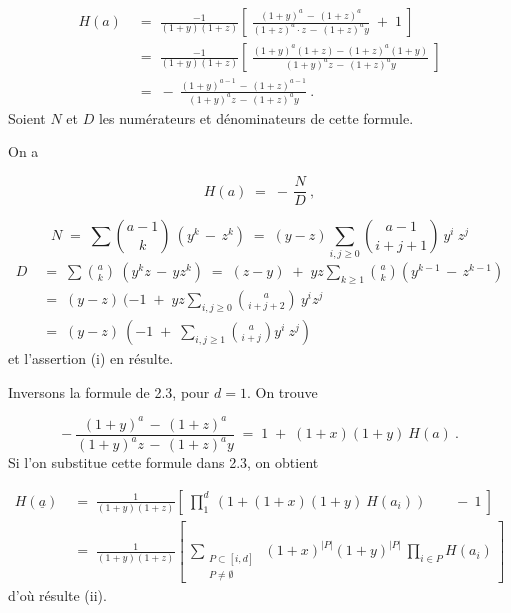 \begin{equation*}
\begin{aligned}
H(a) \;&=\; \frac{-1}{(1+y)(1+z)}\left[\ \frac{(1+y)^{a} \,-\, (1+z)^{a}}{(1+z)^{a}\cdot z \,-\, (1+z)^{a}y} \;+\; 1\ \right]\\[2ex]
&=\; \frac{-1}{(1+y)(1+z)}\left[\ \frac{(1+y)^{a}(1+z)-(1+z)^{a}(1+y)}{(1+y)^{a}z \,-\, (1+z)^{a}y}\ \right]\\[2ex]
&=\; -\ \frac{(1+y)^{a-1} \,-\, (1+z)^{a-1}}{(1+y)^{a}z \,-\, (1+z)^{a}y}\ .
\end{aligned}
\end{equation*}
Soient $N$ et $D$ les numérateurs et dénominateurs de cette formule.

On a

\begin{equation*}
H(a) \;=\; -\,\frac{N}{D}\ , 
\end{equation*}


\begin{equation*}
 N \;=\; \sum \binom{a-1}{k}\ (y^{k} \,-\, z^{k}) \;=\; (y-z) \sum_{i,j\geq 0}\binom{a-1}{i+j+1}\ y^{i}\ z^{j}
\end{equation*}
\begin{equation*}
\begin{aligned}
D \;&=\; \sum \binom{a}{k}\ (y^{k}z \,-\, yz^{k}) \;=\; (z-y) \;+\; yz \sum_{k\geq 1}\binom{a}{k}\!\left(y^{k-1} \,-\, z^{k-1}\right)\\[2ex]
&=\; (y-z)\ (-1 \;+\; yz \sum_{i,j\geq 0}\binom{a}{i+j+2}\ y^{i}z^{j}\\[2ex]
&=\; (y-z)\ (-1 \;+\; \sum_{i,j\geq 1}\binom{a}{i+j}y^{i}\ z^{j})
\end{aligned}
\end{equation*}
et l'assertion (i) en résulte.

Inversons la formule de 2.3, pour $d = 1$. On trouve

\begin{equation*}
-\ \frac{(1+y)^{a} \,-\, (1+z)^{a}}{(1+y)^{a}z \,-\, (1+z)^{a}y} \;=\; 1 \;+\; (1+x)(1+y)\ H(a)\ .
\end{equation*}
Si l'on substitue cette formule dans 2.3, on obtient

\begin{equation*}
\begin{aligned}
H(\underline{a}) \;&=\; \frac{1}{(1+y)(1+z)}\left[\ \prod_{1}^{d}\ (1+(1+x)(1+y)\ H(a_{i}))\qquad -\ 1\ \right]\\[2ex]
&=\;\frac{1}{(1+y)(1+z)}\left[\ \sum_{\substack{P \subset [i,d] \\ P \neq \emptyset}}\ (1+x)^{|P|}(1+y)^{|P|}\ \prod_{i \in P} H(a_{i})\ \right]
\end{aligned}
\end{equation*}
d'où résulte (ii).

